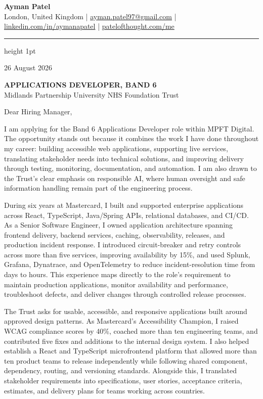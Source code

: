 \documentclass[a4paper,10.5pt]{article}
\begin{document}
\begin{center}
  {\LARGE \textbf{Ayman Patel}}\\
  \vspace{4pt}
  {\small
  London, United Kingdom \quad | \quad
  \href{mailto:ayman.patel97@gmail.com}{ayman.patel97@gmail.com} \quad | \quad
  \href{https://linkedin.com/in/aymanapatel}{linkedin.com/in/aymanapatel} \quad | \quad
  \href{https://patelofthought.com/me}{patelofthought.com/me}
  }
\end{center}

\vspace{-3pt}
{\color{teal}\hrule height 1pt}

\vspace{8pt}
26 August 2026

\vspace{4pt}
{\color{teal}\textbf{\MakeUppercase{Applications Developer, Band 6}}}\\
Midlands Partnership University NHS Foundation Trust

\vspace{2pt}
Dear Hiring Manager,

I am applying for the Band 6 Applications Developer role within MPFT Digital. The opportunity stands out because it combines the work I have done throughout my career: building accessible web applications, supporting live services, translating stakeholder needs into technical solutions, and improving delivery through testing, monitoring, documentation, and automation. I am also drawn to the Trust's clear emphasis on responsible AI, where human oversight and safe information handling remain part of the engineering process.

During six years at Mastercard, I built and supported enterprise applications across React, TypeScript, Java/Spring APIs, relational databases, and CI/CD. As a Senior Software Engineer, I owned application architecture spanning frontend delivery, backend services, caching, observability, releases, and production incident response. I introduced circuit-breaker and retry controls across more than five services, improving availability by 15\%, and used Splunk, Grafana, Dynatrace, and OpenTelemetry to reduce incident-resolution time from days to hours. This experience maps directly to the role's requirement to maintain production applications, monitor availability and performance, troubleshoot defects, and deliver changes through controlled release processes.

The Trust asks for usable, accessible, and responsive applications built around approved design patterns. As Mastercard's Accessibility Champion, I raised WCAG compliance scores by 40\%, coached more than ten engineering teams, and contributed five fixes and additions to the internal design system. I also helped establish a React and TypeScript microfrontend platform that allowed more than ten product teams to release independently while following shared component, dependency, routing, and versioning standards. Alongside this, I translated stakeholder requirements into specifications, user stories, acceptance criteria, estimates, and delivery plans for teams working across countries.
\end{document}
